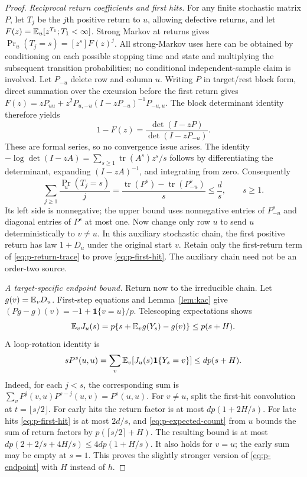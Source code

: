 \begin{proof}
\emph{Reciprocal return coefficients and first hits.}
For any finite stochastic matrix $P$, let $T_j$ be the $j$th positive
return to $u$, allowing defective returns, and let
$F(z)=\mathbb E_u[z^{T_1};T_1<\infty]$.  Strong Markov at returns gives
$\Pr_u(T_j=s)=[z^s]F(z)^j$.  All strong-Markov uses here can be obtained
by conditioning on each possible stopping time and state and multiplying
the subsequent transition probabilities; no conditional independent-sample
claim is involved.  Let $P_{-u}$ delete row and column $u$.  Writing $P$
in target/rest block form, direct summation over the excursion before the
first return gives
$F(z)=zP_{uu}+z^2P_{u,-u}(I-zP_{-u})^{-1}P_{-u,u}$.
The block determinant identity therefore yields
\[
 1-F(z)=\frac{\det(I-zP)}{\det(I-zP_{-u})}.
\]
These are formal series, so no convergence issue arises.  The identity
$-\log\det(I-zA)=\sum_{s\ge1}\operatorname{tr}(A^s)z^s/s$
follows by differentiating the determinant, expanding $(I-zA)^{-1}$,
and integrating from zero.  Consequently
\begin{equation}\label{eq:p-return-trace}
 \sum_{j\ge1}\frac{\Pr_u(T_j=s)}j
 =\frac{\operatorname{tr}(P^s)-\operatorname{tr}(P_{-u}^s)}s
 \le\frac ds,\qquad s\ge1.
\end{equation}
Its left side is nonnegative; the upper bound uses nonnegative entries
of $P_{-u}^s$ and diagonal entries of $P^s$ at most one.
Now change only row $u$ to send $u$ deterministically to $v\ne u$.
In this auxiliary stochastic chain, the first positive return has law
$1+D_u$ under the original start $v$.  Retain only the first-return
term of \eqref{eq:p-return-trace} to prove \eqref{eq:p-first-hit}.
The auxiliary chain need not be an order-two source.

\emph{A target-specific endpoint bound.}
Return now to the irreducible chain.  Let $g(v)=\mathbb E_vD_u$.
First-step equations and Lemma~\ref{lem:kac} give
$(Pg-g)(v)=-1+\mathbf1\{v=u\}/p$.  Telescoping expectations shows
\begin{equation}\label{eq:p-expected-count}
 \mathbb E_vJ_u(s)=p\{s+\mathbb E_vg(Y_s)-g(v)\}\le p(s+H).
\end{equation}
A loop-rotation identity is
\[
 sP^s(u,u)=\sum_v\mathbb E_v[J_u(s)\mathbf1\{Y_s=v\}]
 \le dp(s+H).
\]
Indeed, for each $j<s$, the corresponding sum is
$\sum_vP^j(v,u)P^{s-j}(u,v)=P^s(u,u)$.
For $v\ne u$, split the first-hit convolution at $t=\lfloor s/2\rfloor$.
For early hits the return factor is at most $dp(1+2H/s)$.
For late hits \eqref{eq:p-first-hit} is at most $2d/s$, and
\eqref{eq:p-expected-count} from $u$ bounds the sum of return factors
by $p(\lceil s/2\rceil+H)$.  The resulting bound is at most
$dp(2+2/s+4H/s)\le4dp(1+H/s)$.  It also holds for $v=u$;
the early sum may be empty at $s=1$.  This proves the slightly stronger
version of \eqref{eq:p-endpoint} with $H$ instead of $h$.


\end{proof}
